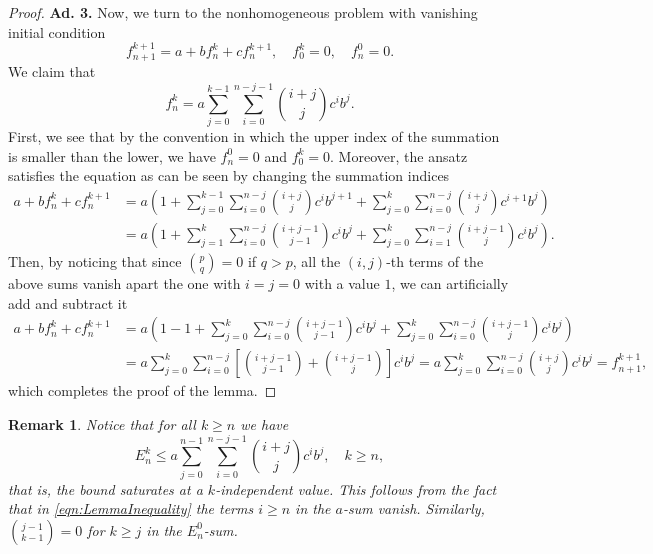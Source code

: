 \documentclass[12pt,a4paper]{article}
\newtheorem{rem}{Remark}
\begin{document}
\begin{proof}
	\medskip\noindent\textbf{Ad. 3.} Now, we turn to the nonhomogeneous problem with vanishing initial condition
	\begin{equation}
		f^{k+1}_{n+1} = a + b f^k_n + c f^{k+1}_{n}, \quad f^k_0 = 0, \quad f^0_n = 0.
	\end{equation}
	We claim that
	\begin{equation}
		f^k_n = a \sum_{j=0}^{k-1} \sum_{i=0}^{n-j-1} \binom{i+j}{j} c^i b^j.
	\end{equation}
	First, we see that by the convention in which the upper index of the summation is smaller than the lower, we have $f^0_n = 0$ and $f^k_0 = 0$. Moreover, the ansatz satisfies the equation as can be seen by changing the summation indices
	\begin{equation}
		\begin{split}
			a + b f^k_n + c f^{k+1}_{n} 
			&= a\left(1+\sum_{j=0}^{k-1} \sum_{i=0}^{n-j} \binom{i+j}{j} c^i b^{j+1} + \sum_{j=0}^{k} \sum_{i=0}^{n-j} \binom{i+j}{j} c^{i+1} b^j\right) \\
			&= a\left(1+\sum_{j=1}^{k} \sum_{i=0}^{n-j} \binom{i+j-1}{j-1} c^i b^{j} + \sum_{j=0}^{k} \sum_{i=1}^{n-j} \binom{i+j-1}{j} c^{i} b^j\right).
		\end{split}
	\end{equation}
	Then, by noticing that since $\binom{p}{q} = 0$ if $q > p$, all the $(i,j)$-th terms of the above sums vanish apart the one with $i = j = 0$ with a value $1$, we can artificially add and subtract it
	\begin{equation}
		\begin{split}
			a + b f^k_n + c f^{k+1}_{n} 
			&= a\left(1-1+\sum_{j=0}^{k} \sum_{i=0}^{n-j} \binom{i+j-1}{j-1} c^i b^{j} + \sum_{j=0}^{k} \sum_{i=0}^{n-j} \binom{i+j-1}{j} c^{i} b^j\right) \\
			&= a\sum_{j=0}^{k} \sum_{i=0}^{n-j} \left[\binom{i+j-1}{j-1} + \binom{i+j-1}{j}  \right] c^i b^{j} = a\sum_{j=0}^{k} \sum_{i=0}^{n-j} \binom{i+j}{j} c^i b^{j} = f^{k+1}_{n+1},
		\end{split}
	\end{equation}
	which completes the proof of the lemma.
\end{proof}

\begin{rem}
	Notice that for all $k \geq n$ we have 
	\begin{equation}
		E^k_n \leq a \sum_{j=0}^{n-1} \sum_{i=0}^{n-j-1} \binom{i+j}{j} c^i b^j, \quad k \geq n,
	\end{equation}
	that is, the bound saturates at a $k$-independent value. This follows from the fact that in \eqref{eqn:LemmaInequality} the terms $i \geq n$ in the $a$-sum vanish. Similarly, $\binom{j-1}{k-1} = 0$ for $k\geq j$ in the $E_n^0$-sum.  
\end{rem}
\end{document}
